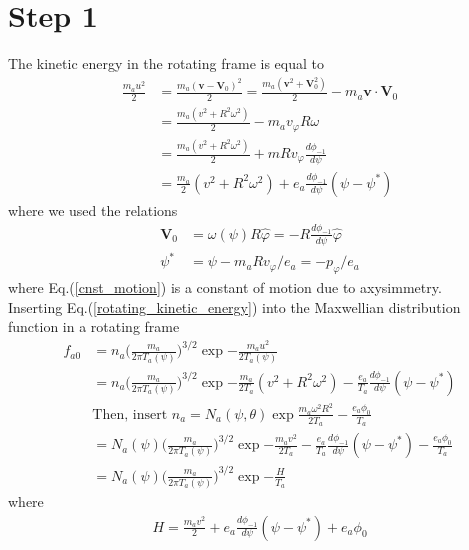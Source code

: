 \section{Step 1}
The kinetic energy in the rotating frame is equal to
\begin{align}
    \frac{m_a u^2}{2} &= \frac{m_a(\bm{v}-\bm{V}_0)^2}{2} = \frac{m_a (\bm{v}^2+\bm{V}_0^2)}{2}-m_a \bm{v} \cdot \bm{V}_0 \nonumber \\ 
    &= \frac{m_a(v^2+R^2 \omega^2)}{2}-m_a v_\varphi R \omega \nonumber \\
    &= \frac{m_a(v^2+R^2 \omega^2)}{2} + mRv_\varphi \frac{d\phi_{-1}}{d\psi} \nonumber \\
    &= \boxed{\frac{m_a}{2}(v^2+R^2\omega^2) + e_a  \frac{d\phi_{-1}}{d\psi}(\psi-\psi^*)} \label{rotating_kinetic_energy}
\end{align}
where we used the relations 
\begin{align}
    \bm{V}_0 &= \omega(\psi)R \hat{\varphi} = -R \frac{d\phi_{-1}}{d\psi} \hat{\varphi} \label{flow} \\
    \psi^* &= \psi - m_a R v_\varphi / e_a = -p_\varphi / e_a \label{cnst_motion}
\end{align}
where Eq.(\ref{cnst_motion}) is a constant of motion due to axysimmetry.\\
Inserting Eq.(\ref{rotating_kinetic_energy}) into the Maxwellian distribution function in a rotating frame 
\begin{align}
    f_{a0}&=n_a \Big( \frac{m_a}{2\pi T_a(\psi)} \Big)^{3/2} \exp{-\frac{m_a u^2}{2T_a(\psi)}} \nonumber \\
    &= n_a \Big( \frac{m_a}{2\pi T_a(\psi)} \Big)^{3/2} \exp{-\frac{m_a}{2T_a}(v^2+R^2\omega^2)-\frac{e_a}{T_a}\frac{d\phi_{-1}}{d\psi}(\psi-\psi^*)} \nonumber \\
    &\text{Then, insert $n_a=N_a(\psi,\theta)\exp{\frac{m_a \omega^2 R^2}{2T_a}-\frac{e_a\phi_0}{T_a}}$} \nonumber \\
    &= N_a(\psi) \Big( \frac{m_a}{2\pi T_a(\psi)} \Big)^{3/2} \exp{-\frac{m_a v^2}{2T_a}-\frac{e_a}{T_a}\frac{d\phi_{-1}}{d\psi}(\psi-\psi^*)-\frac{e_a \phi_0}{T_a}} \nonumber \\
    &=N_a(\psi) \Big( \frac{m_a}{2\pi T_a(\psi)} \Big)^{3/2} \exp{-\frac{H}{T_a}}
\end{align}
where 
\begin{align}
    H = \frac{m_a v^2}{2}+e_a\frac{d\phi_{-1}}{d\psi}(\psi-\psi^*)+e_a \phi_0
\end{align}

